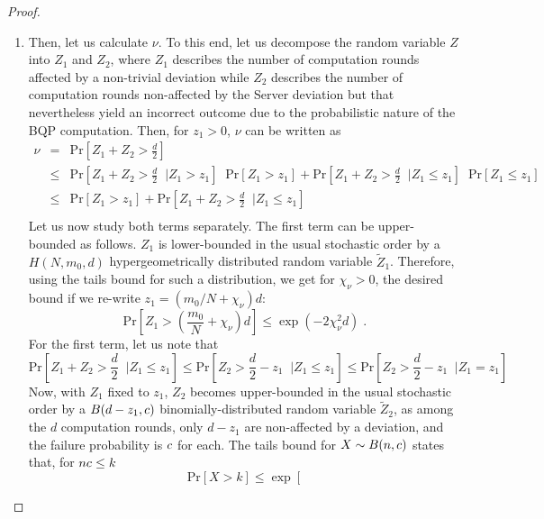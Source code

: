 \begin{proof}
\begin{enumerate}[label=\arabic*)]
    \item Then, let us calculate $\nu$.
    To this end, let us decompose the random variable $Z$ into $Z_1$ and $Z_2$, where $Z_1$ describes the number of computation rounds affected by a non-trivial deviation while $Z_2$ describes the number of computation rounds non-affected by the Server deviation but that nevertheless yield an incorrect outcome due to the probabilistic nature of the BQP computation.
    Then, for $z_1>0$, $\nu$ can be written as
    \begin{eqnarray}
        \nu &=& \mathrm{Pr}\left[Z_1 + Z_2 > \frac{d}{2}\right] \\
        &\leq& \mathrm{Pr}\left[Z_1 + Z_2 > \frac{d}{2} \;\; | Z_1> z_1\right] \;\; \mathrm{Pr}[Z_1>z_1]
            + \mathrm{Pr}\left[Z_1 + Z_2 > \frac{d}{2} \;\; | Z_1\leq  z_1\right] \;\; \mathrm{Pr}[Z_1\leq z_1] \\
        &\leq& \mathrm{Pr}[Z_1>z_1]
            + \mathrm{Pr}\left[Z_1 + Z_2 > \frac{d}{2} \;\; | Z_1\leq  z_1\right] \\
    \end{eqnarray}
    Let us now study both terms separately.
    The first term can be upper-bounded as follows. $Z_1$ is lower-bounded in the usual stochastic order by a $H(N, m_0, d)$ hypergeometrically distributed random variable $\tilde Z_1$.
    Therefore, using the tails bound for such a distribution, we get for $\chi_\nu>0$, the desired bound if we re-write $z_1 = (m_0/N+\chi_\nu)d$:
    \begin{equation}
        \mathrm{Pr}\left[ Z_1 > \left( \dfrac{m_0}{N} + \chi_\nu \right)d \right] \leq \exp(-2\chi_\nu^2 d)\; .
    \end{equation}
    For the first term, let us note that
    \begin{equation}
        \mathrm{Pr}\left[Z_1 + Z_2 > \frac{d}{2} \;\; | Z_1\leq  z_1\right] \leq \mathrm{Pr}\left[Z_2 > \frac{d}{2} - z_1 \;\; | Z_1\leq  z_1\right] \leq \mathrm{Pr}\left[Z_2 > \frac{d}{2} - z_1 \;\; | Z_1= z_1\right]
    \end{equation}
    Now, with $Z_1$ fixed to $z_1$, $Z_2$ becomes upper-bounded in the usual stochastic order by a $B(d-z_1, c)$ binomially-distributed random variable $\tilde Z_2$, as among the $d$ computation rounds, only $d-z_1$ are non-affected by a deviation, and the failure probability is $c$ for each.
    The tails bound for $X \sim B(n,c)$ states that, for $nc \le k$
    \begin{equation}
        \mathrm{Pr}[X> k] \leq \exp\left[

\end{equation}
\end{enumerate}
\end{proof}
